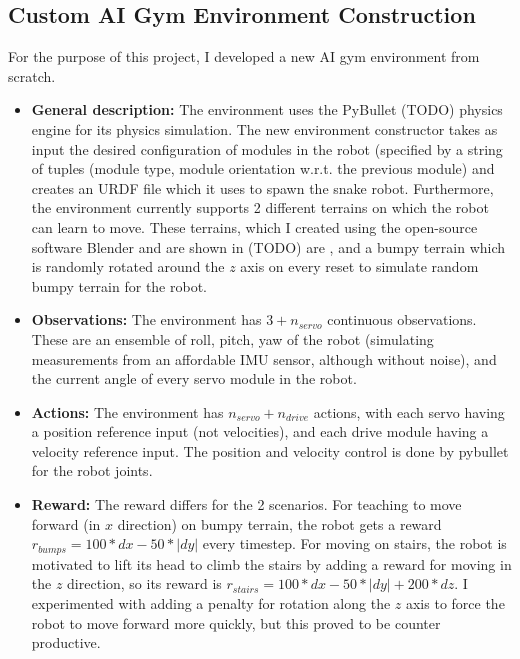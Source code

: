 \documentclass{article}
\begin{document}
\subsection{Custom AI Gym Environment Construction}
For the purpose of this project, I developed a new AI gym environment from scratch.
\begin{itemize}
  \item \textbf{General description:} The environment uses the PyBullet (TODO) physics engine for its physics simulation. 
The new environment constructor takes as input the desired configuration of modules in the robot (specified by a string of tuples (module type, module orientation w.r.t. the previous module) and creates an URDF file which it uses to spawn the snake robot.
Furthermore, the environment currently supports 2 different terrains on which the robot can learn to move.
    These terrains, which I created using the open-source software Blender and are shown in (TODO) are , and a bumpy terrain which is randomly rotated around the $z$ axis on every reset to simulate random bumpy terrain for the robot.
  \item \textbf{Observations:} The environment has $3+ n_{servo}$ continuous observations. These are an ensemble of roll, pitch, yaw of the robot (simulating measurements from an affordable IMU sensor, although without noise), and the current angle of every servo module in the robot.
  \item \textbf{Actions:}  The environment has $n_{servo} + n_{drive}$ actions, with each servo having a position reference input (not velocities), and each drive module having a velocity reference input. The position and velocity control is done by pybullet for the robot joints.
  \item \textbf{Reward:} The reward differs for the 2 scenarios. For teaching to move forward (in $x$ direction) on bumpy terrain, the robot gets a reward $r_{bumps} = 100*dx - 50*|dy|$ every timestep. For moving on stairs, the robot is motivated to lift its head to climb the stairs by adding a reward for moving in the $z$ direction, so its reward is $r_{stairs} = 100*dx - 50*|dy| + 200*dz$.
    I experimented with adding a penalty for rotation along the $z$ axis to force the robot to move forward more quickly, but this proved to be counter productive.
\end{itemize}
\end{document}
